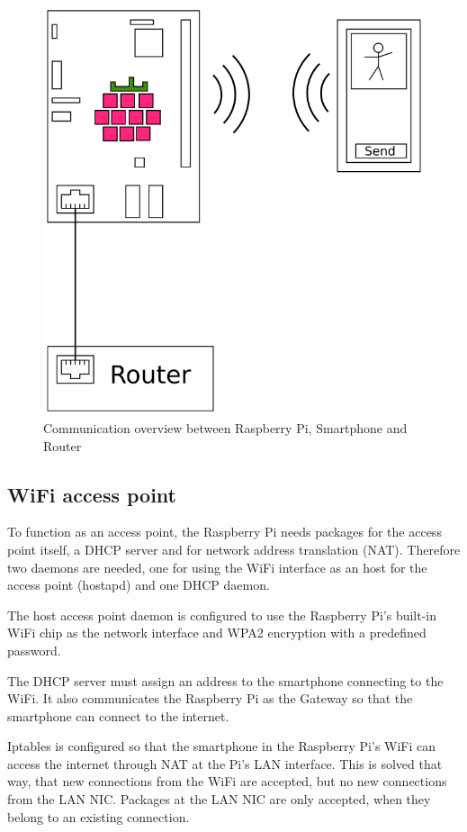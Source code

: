 \documentclass[conference]{IEEEtran}
\begin{document}
\begin{figure}[ht]
\centering
\includegraphics[width=0.75\linewidth]{pics/RasPi-MC}
\caption{Communication overview between Raspberry Pi, Smartphone and Router}
\label{FIG:COMMUNICATION}
\end{figure}

\subsection{WiFi access point}
To function as an access point, the Raspberry Pi needs packages for the access point itself, a DHCP server and for network address translation (NAT). Therefore two daemons are needed, one for using the WiFi interface as an host for the access point (hostapd) and one DHCP daemon.

The host access point daemon is configured to use the Raspberry Pi's built-in WiFi chip as the network interface and WPA2  encryption with a predefined password.

The DHCP server must assign an address to the smartphone connecting to the WiFi. It also communicates the Raspberry Pi as the Gateway so that the smartphone can connect to the internet.

Iptables is configured so that the smartphone in the Raspberry Pi's WiFi can access the internet through NAT at the Pi's LAN interface. This is solved that way, that new connections from the WiFi are accepted, but no new connections from the LAN NIC. Packages at the LAN NIC are only accepted, when they belong to an existing connection.
\end{document}
